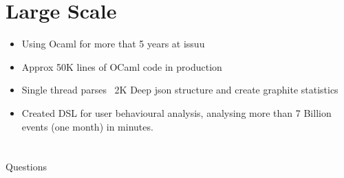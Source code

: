 \documentclass[xcolor=svgnames]{beamer}
\renewcommand{\_}{\mathunderscore}
\begin{document}
\section{Large Scale}
\begin{frame}[fragile]
  \begin{itemize}
  \item Using Ocaml for more that 5 years at issuu
  \item Approx 50K lines of OCaml code in production
  \item Single thread parses ~2K Deep json structure and create
    graphite statistics
  \item Created DSL for user behavioural analysis, analysing more than
    7 Billion events (one month) in minutes.
  \end{itemize}
\end{frame}

\section{}
\begin{frame}[fragile]
  \begin{center}
    \LARGE Questions
  \end{center}
\end{frame}
\end{document}
